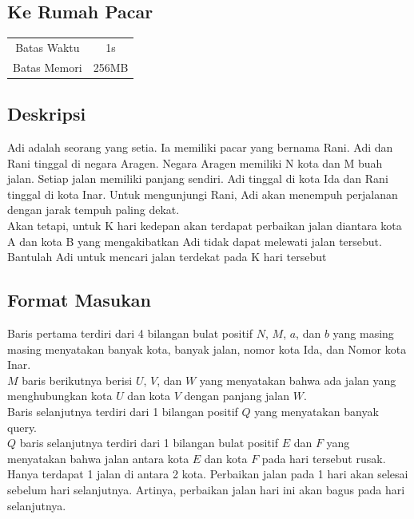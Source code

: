 \documentclass{article}
\begin{document}
\begin{center}

    
    \section*{Ke Rumah Pacar} %

    \begin{tabular}{ | c c | }
        \hline
        Batas Waktu  & 1s \\    %
        Batas Memori & 256MB \\  %
        \hline
    \end{tabular}
\end{center}

\subsection*{Deskripsi}
Adi adalah seorang yang setia. Ia memiliki pacar yang bernama Rani. Adi dan Rani tinggal di negara Aragen. Negara Aragen memiliki N kota dan M buah jalan. Setiap jalan memiliki panjang sendiri. Adi tinggal di kota Ida dan Rani tinggal di kota Inar. Untuk mengunjungi Rani, Adi akan menempuh perjalanan dengan jarak tempuh paling dekat. \\

Akan tetapi, untuk K hari kedepan akan terdapat perbaikan jalan diantara kota A dan kota B yang mengakibatkan Adi tidak dapat melewati jalan tersebut. Bantulah Adi untuk mencari jalan terdekat pada K hari tersebut

\subsection*{Format Masukan}

Baris pertama terdiri dari 4 bilangan bulat positif $N$, $M$, $a$, dan $b$ yang masing masing menyatakan banyak kota, banyak jalan, nomor kota Ida, dan Nomor kota Inar.\\
$M$ baris berikutnya berisi $U$, $V$, dan $W$ yang menyatakan bahwa ada jalan yang menghubungkan kota $U$ dan kota $V$ dengan panjang jalan $W$.\\
Baris selanjutnya terdiri dari 1 bilangan positif $Q$ yang menyatakan banyak query.\\
$Q$ baris selanjutnya terdiri dari 1 bilangan bulat positif $E$ dan $F$ yang menyatakan bahwa jalan antara kota $E$ dan kota $F$ pada hari tersebut rusak.\\ 
Hanya terdapat 1 jalan di antara 2 kota.
Perbaikan jalan pada 1 hari akan selesai sebelum hari selanjutnya. Artinya, perbaikan jalan hari ini akan bagus pada hari selanjutnya.
\end{document}

